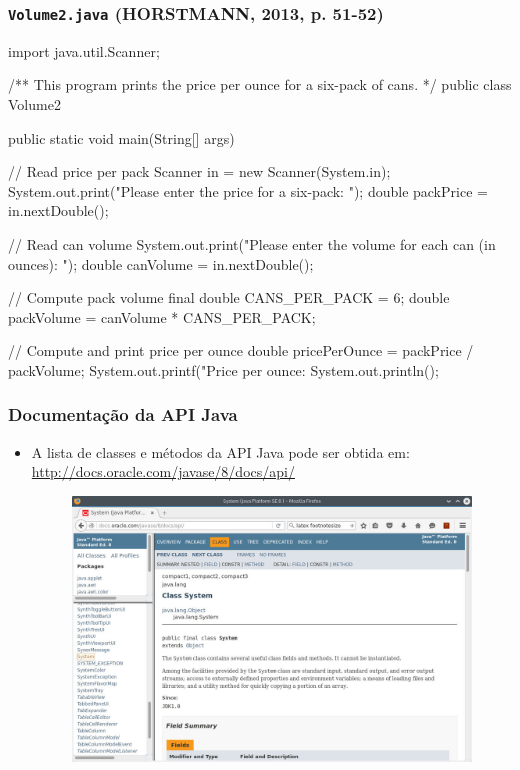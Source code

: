 \documentclass[xcolor={dvipsnames,table},aspectratio=169]{beamer}
\begin{document}
\begin{frame}[fragile]\frametitle{\texttt{Volume2.java} {\tiny (HORSTMANN, 2013, p. 51-52)}}
{\tiny
\begin{javacode}
import java.util.Scanner;

/**
   This program prints the price per ounce for a six-pack of cans.
*/
public class Volume2 {
   public static void main(String[] args) {
      // Read price per pack
      Scanner in = new Scanner(System.in);
      System.out.print("Please enter the price for a six-pack: ");
      double packPrice = in.nextDouble();

      // Read can volume
      System.out.print("Please enter the volume for each can (in ounces): ");
      double canVolume = in.nextDouble();

      // Compute pack volume
      final double CANS_PER_PACK = 6;
      double packVolume = canVolume * CANS_PER_PACK;

      // Compute and print price per ounce
      double pricePerOunce = packPrice / packVolume;
      System.out.printf("Price per ounce: %
      System.out.println();
   }
}
\end{javacode}
}
\end{frame}

\begin{frame}\frametitle{Documentação da API Java}
\begin{itemize}
	\item A lista de classes e métodos da API Java pode ser obtida em: \url{http://docs.oracle.com/javase/8/docs/api/}
\begin{figure}[h]
	\includegraphics[height=0.6\paperheight,center]{pucrs-ep-fprog-unidade_02-tipos_de_dados_fundamentais-laminas-api_java.jpg}
\end{figure}
\end{itemize}
\end{frame}
\end{document}
